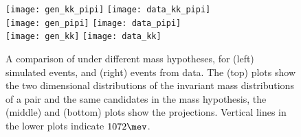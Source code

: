 \begin{figure}
  \begin{center}
    \texttt{[image: gen\_kk\_pipi]}
    \texttt{[image: data\_kk\_pipi]}\\
    \texttt{[image: gen\_pipi]}
    \texttt{[image: data\_pipi]}\\
    \texttt{[image: gen\_kk]}
    \texttt{[image: data\_kk]}
    \caption{
      A comparison of \decay{\KS}{\pi\pi} under different mass hypotheses, for
      (left) simulated events, and
      (right) events from data.
      The (top) plots show the two dimensional distributions of the invariant mass distributions of
      a \pipi pair and the same candidates in the \kk mass hypothesis, the (middle) and (bottom)
      plots show the projections.
      Vertical lines in the lower plots indicate $1072\mev$.
    }
    \label{fig:db:x1070:2d}
  \end{center}
\end{figure}















